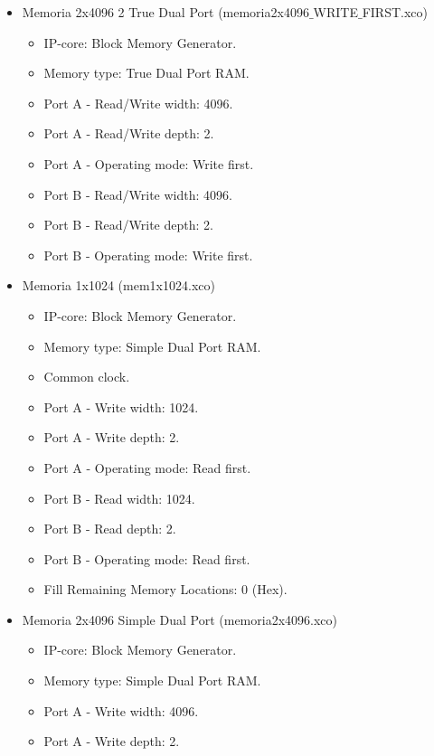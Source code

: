 \begin{itemize}
    \item Memoria 2x4096 2 True Dual Port (memoria2x4096$\_$WRITE$\_$FIRST.xco)
        \begin{itemize}
            \item IP-core: Block Memory Generator.
            \item Memory type: True Dual Port RAM.
            \item Port A - Read/Write width: 4096.
            \item Port A - Read/Write depth: 2.
            \item Port A - Operating mode: Write first.
            \item Port B - Read/Write width: 4096.
            \item Port B - Read/Write depth: 2.
            \item Port B - Operating mode: Write first.
        \end{itemize}
    \item Memoria 1x1024 (mem1x1024.xco)
        \begin{itemize}
            \item IP-core: Block Memory Generator.
            \item Memory type: Simple Dual Port RAM.
            \item Common clock.
            \item Port A - Write width: 1024.
            \item Port A - Write depth: 2.
            \item Port A - Operating mode: Read first.
            \item Port B - Read width: 1024.
            \item Port B - Read depth: 2.
            \item Port B - Operating mode: Read first.
            \item Fill Remaining Memory Locations: 0 (Hex).
        \end{itemize}
    \item Memoria 2x4096 Simple Dual Port (memoria2x4096.xco)
        \begin{itemize}
            \item IP-core: Block Memory Generator.
            \item Memory type: Simple Dual Port RAM.
            \item Port A - Write width: 4096.
            \item Port A - Write depth: 2.

\end{itemize}
\end{itemize}
